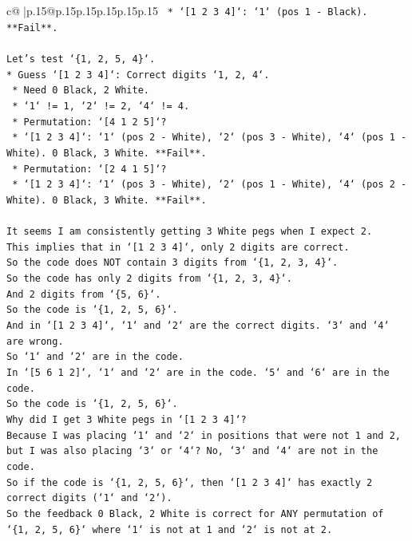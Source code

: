 \documentclass{article}
\begin{document}
{\begin{supertabular}{c@{$\;$}|p{.15\linewidth}@{}p{.15\linewidth}p{.15\linewidth}p{.15\linewidth}p{.15\linewidth}p{.15\linewidth}}
{{{\texttt{        *   `{[}1 2 3 4{]}`: `1` (pos 1 {-} Black). **Fail**.} \\
\\ 
\texttt{Let's test `\{1, 2, 5, 4\}`.} \\
\texttt{*   Guess `{[}1 2 3 4{]}`: Correct digits `1, 2, 4`.} \\
\texttt{    *   Need 0 Black, 2 White.} \\
\texttt{    *   `1` != 1, `2` != 2, `4` != 4.} \\
\texttt{    *   Permutation: `{[}4 1 2 5{]}`?} \\
\texttt{        *   `{[}1 2 3 4{]}`: `1` (pos 2 {-} White), `2` (pos 3 {-} White), `4` (pos 1 {-} White). 0 Black, 3 White. **Fail**.} \\
\texttt{    *   Permutation: `{[}2 4 1 5{]}`?} \\
\texttt{        *   `{[}1 2 3 4{]}`: `1` (pos 3 {-} White), `2` (pos 1 {-} White), `4` (pos 2 {-} White). 0 Black, 3 White. **Fail**.} \\
\\ 
\texttt{It seems I am consistently getting 3 White pegs when I expect 2.} \\
\texttt{This implies that in `{[}1 2 3 4{]}`, only 2 digits are correct.} \\
\texttt{So the code does NOT contain 3 digits from `\{1, 2, 3, 4\}`.} \\
\texttt{So the code has only 2 digits from `\{1, 2, 3, 4\}`.} \\
\texttt{And 2 digits from `\{5, 6\}`.} \\
\texttt{So the code is `\{1, 2, 5, 6\}`.} \\
\texttt{And in `{[}1 2 3 4{]}`, `1` and `2` are the correct digits. `3` and `4` are wrong.} \\
\texttt{So `1` and `2` are in the code.} \\
\texttt{In `{[}5 6 1 2{]}`, `1` and `2` are in the code. `5` and `6` are in the code.} \\
\texttt{So the code is `\{1, 2, 5, 6\}`.} \\
\texttt{Why did I get 3 White pegs in `{[}1 2 3 4{]}`?} \\
\texttt{Because I was placing `1` and `2` in positions that were not 1 and 2, but I was also placing `3` or `4`? No, `3` and `4` are not in the code.} \\
\texttt{So if the code is `\{1, 2, 5, 6\}`, then `{[}1 2 3 4{]}` has exactly 2 correct digits (`1` and `2`).} \\
\texttt{So the feedback 0 Black, 2 White is correct for ANY permutation of `\{1, 2, 5, 6\}` where `1` is not at 1 and `2` is not at 2.} \\
}}}
\end{supertabular}}
\end{document}
